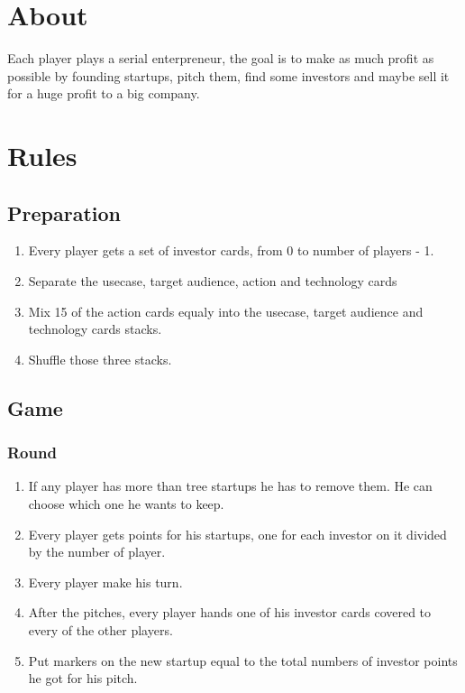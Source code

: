 
\section*{About}

Each player plays a serial enterpreneur, the goal is to make as much profit as possible by founding startups, pitch them,
find some investors and maybe sell it for a huge profit to a big company.

\section*{Rules}
\subsection*{Preparation}
\begin{enumerate}
\item Every player gets a set of investor cards, from 0 to number of players - 1.
\item Separate the usecase, target audience, action and technology cards
\item Mix 15 of the action cards equaly into the usecase, target audience and technology cards stacks.
\item Shuffle those three stacks.
\end{enumerate}

\subsection*{Game}
\subsubsection*{Round}
\begin{enumerate}
\item If any player has more than tree startups he has to remove them. He can choose which one he wants to keep.
\item Every player gets points for his startups, one for each investor on it divided by the number of player.
\item Every player make his turn.
\item After the pitches, every player hands one of his investor cards covered to every of the other players.
\item Put markers on the new startup equal to the total numbers of investor points he got for his pitch.
\end{enumerate}

